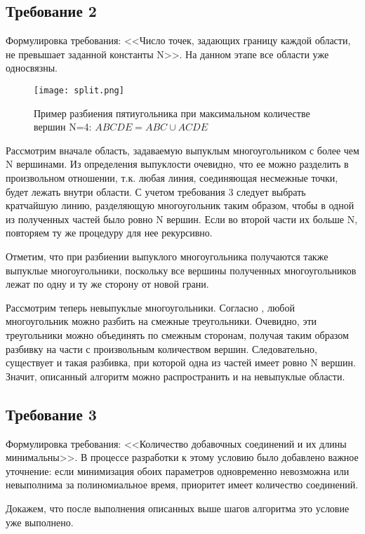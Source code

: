 \subsection{Требование 2}
\label{task2}

Формулировка требования: <<Число точек, задающих границу каждой области, не превышает заданной константы N>>. На данном этапе все области уже односвязны.

\begin{figure}[h]
    \centering
    \texttt{[image: split.png]}
    \caption{Пример разбиения пятиугольника при максимальном количестве вершин N=4: $ABCDE = ABC \cup ACDE$}
\end{figure}

Рассмотрим вначале область, задаваемую выпуклым многоугольником с более чем N вершинами. Из определения выпуклости очевидно, что ее можно разделить в произвольном отношении, т.к. любая линия, соединяющая несмежные точки, будет лежать внутри области. С учетом требования 3 следует выбрать кратчайшую линию, разделяющую многоугольник таким образом, чтобы в одной из полученных частей было ровно N вершин. Если во второй части их больше N, повторяем ту же процедуру для нее рекурсивно.

Отметим, что при разбиении выпуклого многоугольника получаются также выпуклые многоугольники, поскольку все вершины полученных многоугольников лежат по одну и ту же сторону от новой грани.

Рассмотрим теперь невыпуклые многоугольники. Согласно \cite{de_berg_chapter_2000}, любой многоугольник можно разбить на смежные треугольники. Очевидно, эти треугольники можно объединять по смежным сторонам, получая таким образом разбивку на части с произвольным количеством вершин. Следовательно, существует и такая разбивка, при которой одна из частей имеет ровно N вершин. Значит, описанный алгоритм можно распространить и на невыпуклые области.

\subsection{Требование 3}
\label{}

Формулировка требования: <<Количество добавочных соединений и их длины минимальны>>. В процессе разработки к этому условию было добавлено важное уточнение: если минимизация обоих параметров одновременно невозможна или невыполнима за полиномиальное время, приоритет имеет количество соединений.

Докажем, что после выполнения описанных выше шагов алгоритма это условие уже выполнено.

